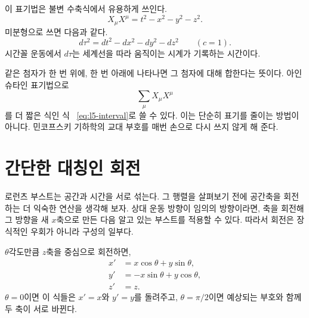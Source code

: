 \begin{classroomqa}
\end{classroomqa}

이 표기법은 불변 수축식에서 유용하게 쓰인다.
\begin{equation}
X_\mu X^\mu=t^2-x^2-y^2-z^2.
\label{eq:l5-interval}
\end{equation}
미분형으로 쓰면 다음과 같다.
\begin{equation}
d\tau^2=dt^2-dx^2-dy^2-dz^2
\qquad (c=1).
\label{eq:l5-proper-time}
\end{equation}
시간꼴 운동에서 \(d\tau\)는 세계선을 따라 움직이는 시계가 기록하는 시간이다.

같은 첨자가 한 번 위에, 한 번 아래에 나타나면 그 첨자에 대해 합한다는 뜻이다. 아인슈타인 표기법으로
\begin{equation}
\sum_{\mu}X_\mu X^\mu
\end{equation}
를 더 짧은 식인 식 ~\eqref{eq:l5-interval}로 쓸 수 있다. 이는 단순히 표기를 줄이는 방법이 아니다. 민코프스키 기하학의 교대 부호를 매번 손으로 다시 쓰지 않게 해 준다.

\begin{classroomqa}
\end{classroomqa}

\section{간단한 대칭인 회전}

로런츠 부스트는 공간과 시간을 서로 섞는다. 그 행렬을 살펴보기 전에 공간축을 회전하는 더 익숙한 연산을 생각해 보자. 상대 운동 방향이 임의의 방향이라면, 축을 회전해 그 방향을 새 \(x\)축으로 만든 다음 알고 있는 부스트를 적용할 수 있다. 따라서 회전은 장식적인 우회가 아니라 구성의 일부다.

\(\theta\)각도만큼 \(z\)축을 중심으로 회전하면,
\begin{align}
x'&=x\cos\theta+y\sin\theta,\nonumber\\
y'&=-x\sin\theta+y\cos\theta,\label{eq:l5-rotation}\\
z'&=z.\nonumber
\end{align}
\(\theta=0\)이면 이 식들은 \(x'=x\)와 \(y'=y\)를 돌려주고, \(\theta=\pi/2\)이면 예상되는 부호와 함께 두 축이 서로 바뀐다.

